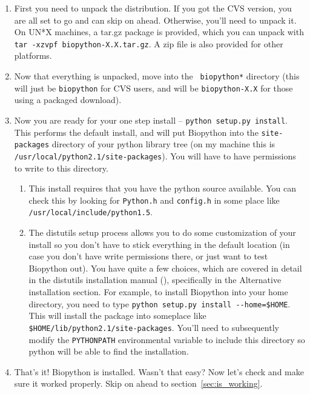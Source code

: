 \documentclass{report}
\begin{document}
\begin{enumerate}

\item First you need to unpack the distribution. If you got the CVS version, you are all set to go and can skip on ahead. Otherwise, you'll need to unpack it. On UN*X machines, a tar.gz package is provided, which you can unpack with \verb|tar -xzvpf biopython-X.X.tar.gz|. A zip file is also provided for other platforms.

\item Now that everything is unpacked, move into the \verb| biopython*| directory (this will just be \verb|biopython| for CVS users, and will be \verb|biopython-X.X| for those using a packaged download). 

\item Now you are ready for your one step install -- \verb|python setup.py install|. This performs the default install, and will put Biopython into the \verb|site-packages| directory of your python library tree (on my machine this is \verb|/usr/local/python2.1/site-packages|). You will have to have permissions to write to this directory. 

\begin{enumerate}

\item This install requires that you have the python source available. You can check this by looking for \verb|Python.h| and \verb|config.h| in some place like \verb|/usr/local/include/python1.5|.

\item The distutils setup process allows you to do some customization of your install so you don't have to stick everything in the default location (in case you don't have write permissions there, or just want to test Biopython out). You have quite a few choices, which are covered in detail in the distutils installation manual (), specifically in the Alternative installation section. For example, to install Biopython into your home directory, you need to type \verb|python setup.py install --home=$HOME|. This will install the package into someplace like \verb|$HOME/lib/python2.1/site-packages|. You'll need to subsequently modify the \verb|PYTHONPATH| environmental variable to include this directory so python will be able to find the installation.

\end{enumerate}

\item That's it! Biopython is installed. Wasn't that easy? Now let's check and make sure it worked properly. Skip on ahead to section~\ref{sec:is_working}.

\end{enumerate}
\end{document}
